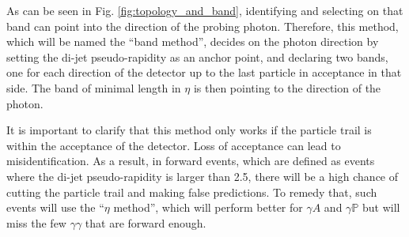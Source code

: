 As can be seen in Fig. \ref{fig:topology_and_band}, identifying and selecting on that band can point into the direction of the probing photon. Therefore, this method, which will be named the ``band method'', decides on the photon direction by setting the di-jet pseudo-rapidity as an anchor point, and declaring two bands, one for each direction of the detector up to the last particle in acceptance in that side. The band of minimal length in $\eta$ is then pointing to the direction of the photon.

It is important to clarify that this method only works if the particle trail is within the acceptance of the detector. Loss of acceptance can lead to misidentification. As a result, in forward events, which are defined as events where the di-jet pseudo-rapidity is larger than 2.5, there will be a high chance of cutting the particle trail and making false predictions. To remedy that, such events will use the ``$\eta$ method'', which will perform better for $\gamma A$ and $\gamma \mathbb{P}$ but will miss the few $\gamma\gamma$ that are forward enough.

\begin{equation}\label{eq:band_method}
\end{equation}
